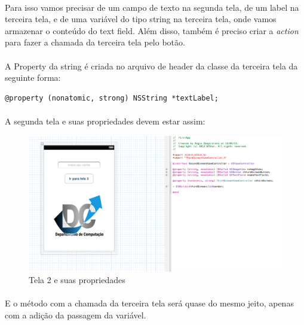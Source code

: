 \documentclass[a4paper,12pt,brazil,doubleside]{book}
\begin{document}
\paragraph{}Para isso vamos precisar de um campo de texto na segunda tela, de um label na terceira tela, e de uma variável do tipo string na terceira tela, onde vamos armazenar o conteúdo do text field. Além disso, também é preciso criar a \emph{action} para fazer a chamada da terceira tela pelo botão.
\paragraph{}A Property da string é criada no arquivo de header da classe da terceira tela da seguinte forma:\\

\begin{lstlisting}
@property (nonatomic, strong) NSString *textLabel;
\end{lstlisting}

\bigskip

\paragraph{}A segunda tela e suas propriedades devem estar assim:\\

\begin{figure}[h]
  \centering
  \includegraphics[totalheight=0.35\textheight]{../figuras/ios/2/xib_tela2_header.png}
  \caption{Tela 2 e suas propriedades}
  \label{fig:a}
\end{figure}

\bigskip
\bigskip

\paragraph{}E o método com a chamada da terceira tela será quase do mesmo jeito, apenas com a adição da passagem da variável.\\
\end{document}
